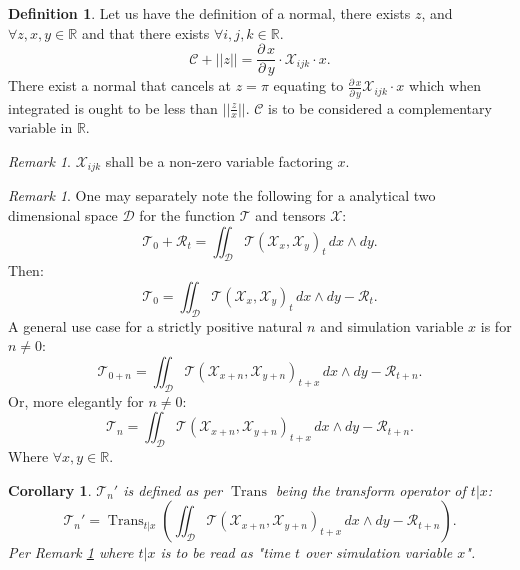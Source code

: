 \documentclass[10pt]{article}
\theoremstyle{plain}
\newtheorem{corollary}[theorem]{Corollary}
\theoremstyle{definition}
\newtheorem{definition}[theorem]{Definition}
\theoremstyle{remark}
\newtheorem{remark}[theorem]{Remark}
\begin{document}
\begin{definition}
	Let us have the definition of a normal, there exists $z$, and $\forall z, x, y \in \mathbb{R}$ and that there exists $\forall i, j, k \in \mathbb{R}$.
	\begin{equation}
		\mathcal{C} + ||z|| = \frac{\partial \, x}{\partial \, y} \cdot \mathcal{X}_{ijk} \cdot x.
	\end{equation}
	There exist a normal that cancels at $z=\pi$ equating to $\frac{\partial \, x}{\partial \, y} \mathcal{X}_{ijk} \cdot x$ which when integrated is ought to be less than $||\frac{z}{x}||$. $\mathcal{C}$ is to be considered a complementary variable in $\mathbb{R}$.
\end{definition}

\begin{remark}
	$\mathcal{X}_{ijk}$ shall be a non-zero variable factoring $x$.
\end{remark}

\begin{remark}
\label{rem:math-special-case}
	One may separately note the following for a analytical two dimensional space $\mathcal{D}$ for the function $\mathcal{T}$ and tensors $\mathcal{X}$:
	\begin{equation}
		\mathcal{T}_0 + \mathcal{R}_{t} = \iint_{\mathcal{D}} \mathcal{T}(\mathcal{X}_{x}, \mathcal{X}_{y})_{t} \, dx \land dy.
	\end{equation}
	Then:
	\begin{equation}
		\mathcal{T}_0 = \iint_{\mathcal{D}} \mathcal{T}(\mathcal{X}_{x}, \mathcal{X}_{y})_{t} \, dx \land dy - \mathcal{R}_{t}.
	\end{equation}
	A general use case for a strictly positive natural $n$ and simulation variable $x$ is for $n \neq 0$:
	\begin{equation}
		\mathcal{T}_{0+n} = \iint_{\mathcal{D}} \mathcal{T}(\mathcal{X}_{x+n}, \mathcal{X}_{y+n})_{t+x} \, dx \land dy - \mathcal{R}_{t+n}.
	\end{equation}
	Or, more elegantly for $n \neq 0$:
	\begin{equation}
		\mathcal{T}_{n} = \iint_{\mathcal{D}} \mathcal{T}(\mathcal{X}_{x+n}, \mathcal{X}_{y+n})_{t+x} \, dx \land dy - \mathcal{R}_{t+n}.
	\end{equation}
	Where $\forall x, y \in \mathbb{R}$.
\end{remark}

\begin{corollary}
	$\mathcal{T}_{n}'$ is defined as per $\operatorname{Trans}$ being the transform operator of $t|x$:
	\begin{equation}
		\mathcal{T}_{n}' =\operatorname{Trans}_{t|x}(\iint_{\mathcal{D}} \mathcal{T}(\mathcal{X}_{x+n}, \mathcal{X}_{y+n})_{t+x} \, dx \land dy - \mathcal{R}_{t+n}).
	\end{equation}
	Per Remark \ref{rem:math-special-case} where $t|x$ is to be read as "time $t$ over simulation variable $x$".
\end{corollary}
\end{document}
